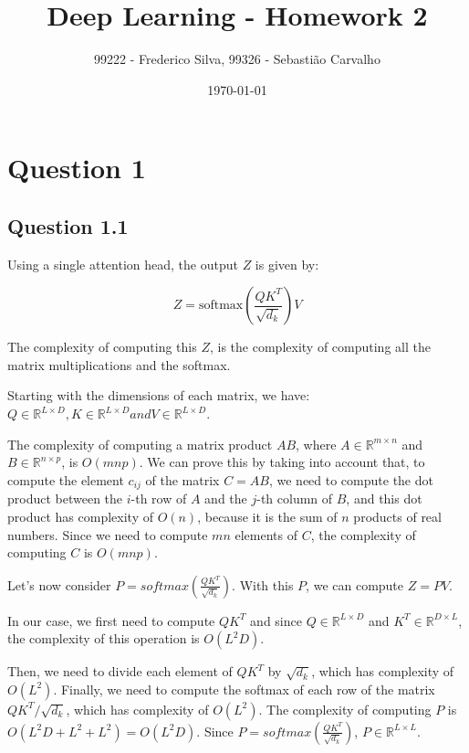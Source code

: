 \documentclass{article}
\title{Deep Learning - Homework 2}
\author{99222 - Frederico Silva, 99326 - Sebastião Carvalho}
\date{\today}
\begin{document}
\maketitle

\tableofcontents

\section{Question 1}

\subsection{Question 1.1}

Using a single attention head, the output $Z$ is given by:

\begin{equation}
    Z = \text{softmax} \left( \frac{QK^T}{\sqrt{d_k}} \right) V
\end{equation}

The complexity of computing this $Z$, is the complexity of computing all the matrix multiplications and the softmax.

Starting with the dimensions of each matrix, we have:
$
    Q \in \mathbb{R}^{L \times D}, K \in \mathbb{R}^{L \times D} and V \in \mathbb{R}^{L \times D}.
$

\bigskip

The complexity of computing a matrix product $AB$, where $A \in \mathbb{R}^{m \times n}$ and $B \in \mathbb{R}^{n \times p}$, is $O(mnp)$.
We can prove this by taking into account that, to compute the element $c_{ij}$ of the matrix $C = AB$, we need to compute the dot product between the $i$-th row of 
$A$ and the $j$-th column of $B$, and this dot product has complexity of $O(n)$, because it is the sum of $n$ products of real numbers.
Since we need to compute $mn$ elements of $C$, the complexity of computing $C$ is $O(mnp)$.

\bigskip

Let's now consider $P = softmax \left( \frac{QK^T}{\sqrt{d_k}} \right)$. With this $P$, we can compute $Z = PV$.

In our case, we first need to compute $QK^T$ and since $Q \in \mathbb{R}^{L \times D}$ and $K^T \in \mathbb{R}^{D \times L}$, 
the complexity of this operation is $O(L^2D)$.

Then, we need to divide each element of $QK^T$ by $\sqrt{d_k}$, which has complexity of $O(L^2)$.
Finally, we need to compute the softmax of each row of the matrix $QK^T / \sqrt{d_k}$, which has complexity of $O(L^2)$.
The complexity of computing $P$ is $O(L^2D + L^2 + L^2) = O(L^2D)$. 
Since $P = softmax \left( \frac{QK^T}{\sqrt{d_k}} \right)$, $P \in \mathbb{R}^{L \times L}$.
\end{document}

